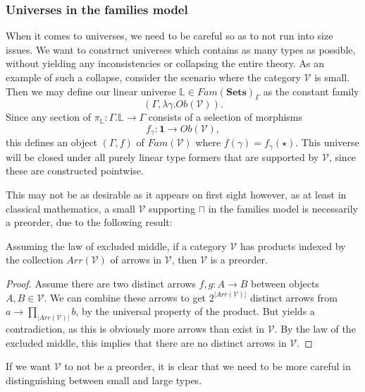\documentclass[a4paper,english]{lipics-v2018}
\begin{document}
\subsubsection{Universes in the families model}\label{universefam}
When it comes to universes, we need to be careful so as to not run into size issues. We want to construct universes which contains as many types as possible, without yielding any inconsistencies or collapsing the entire theory. As an example of such a collapse, consider the scenario where the category $\mathcal{V}$ is small. Then we may define our linear universe $\mathbb{L} \in Fam(\mathbf{Sets})_\Gamma$ as the constant family
\[
  (\Gamma, \lambda \gamma . Ob(\mathcal{V})).
\]
Since any section of $\pi_{\mathbb{L}} : \Gamma.\mathbb{L} \to \Gamma$ consists of a selection of morphisms
\[
  f_\gamma : \mathbf{1} \to Ob(\mathcal{V}),
\]
this defines an object $(\Gamma, f)$ of $Fam(\mathcal{V})$ where $f(\gamma) = f_\gamma(\star)$. This universe will be closed under all purely linear type formers that are supported by $\mathcal{V}$, since these are constructed pointwise.

This may not be as desirable as it appears on first sight however, as at least in classical mathematics, a small $\mathcal{V}$ supporting $\sqcap$ in the families model is necessarily a preorder, due to the following result:
\begin{theorem}
Assuming the law of excluded middle, if a category $\mathcal{V}$ has products indexed by the collection $Arr(\mathcal{V})$ of arrows in $\mathcal{V}$, then $\mathcal{V}$ is a preorder.
  \begin{proof}
    Assume there are two distinct arrows $f, g : A \to B$ between objects $A, B \in \mathcal{V}$. We can combine these arrows to get $2^{|Arr(\mathcal{V})|}$ distinct arrows from $a \to \prod_{|Arr(\mathcal{V})|}b$, by the universal property of the product. But yields a contradiction, as this is obviously more arrows than exist in $\mathcal{V}$. By the law of the excluded middle, this implies that there are no distinct arrows in $\mathcal{V}$.
  \end{proof}
\end{theorem}
If we want $\mathcal{V}$ to not be a preorder, it is clear that we need to be more careful in distinguishing between small and large types.
\end{document}
